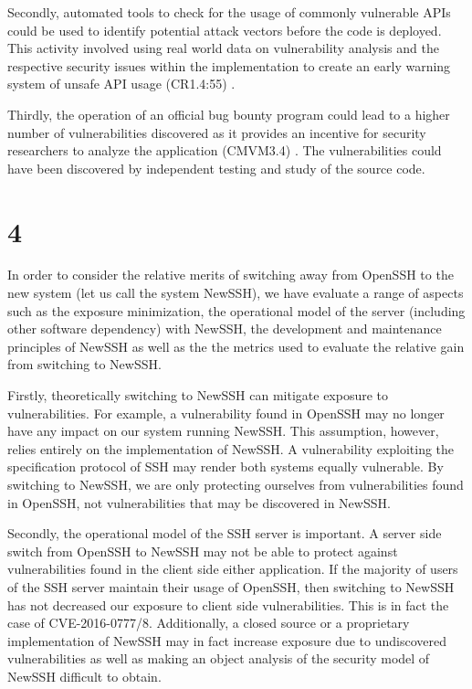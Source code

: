 \documentclass[a4paper, 12pt]{article}
\begin{document}
Secondly, automated tools to check for the usage of commonly vulnerable APIs could be used to identify potential attack vectors before the code is deployed. This activity involved using real world data on vulnerability analysis and the respective security issues within the implementation to create an early warning system of unsafe API usage (CR1.4:55) \cite{BSIMM6-CodeReview}.

Thirdly, the operation of an official bug bounty program could lead to a higher number of vulnerabilities discovered as it provides an incentive for security researchers to analyze the application (CMVM3.4) \cite{BSIMM6-BugBounty}. The vulnerabilities could have been discovered by independent testing and study of the source code.

\setcounter{section}{3}
\section*{4}
In order to consider the relative merits of switching away from OpenSSH to the new system (let us call the system NewSSH), we have evaluate a range of aspects such as the exposure minimization, the operational model of the server (including other software dependency) with NewSSH, the development and maintenance principles of NewSSH as well as the the metrics used to evaluate the relative gain from switching to NewSSH.

Firstly, theoretically switching to NewSSH can mitigate exposure to vulnerabilities. For example, a vulnerability found in OpenSSH may no longer have any impact on our system running NewSSH. This assumption, however, relies entirely on the implementation of NewSSH. A vulnerability exploiting the specification protocol of SSH may render both systems equally vulnerable. By switching to NewSSH, we are only protecting ourselves from vulnerabilities found in OpenSSH, not vulnerabilities that may be discovered in NewSSH.

Secondly, the operational model of the SSH server is important. A server side switch from OpenSSH to NewSSH may not be able to protect against vulnerabilities found in the client side either application. If the majority of users of the SSH server maintain their usage of OpenSSH, then switching to NewSSH has not decreased our exposure to client side vulnerabilities. This is in fact the case of CVE-2016-0777/8. Additionally, a closed source or a proprietary implementation of NewSSH may in fact increase exposure due to undiscovered vulnerabilities as well as making an object analysis of the security model of NewSSH difficult to obtain.
\end{document}
